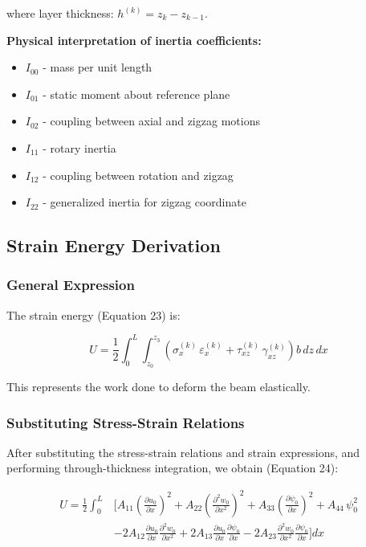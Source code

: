 \documentclass[12pt,a4paper]{article}
\begin{document}
where layer thickness: $h^{(k)} = z_k - z_{k-1}$.

\textbf{Physical interpretation of inertia coefficients:}
\begin{itemize}
\item $I_{00}$ - mass per unit length
\item $I_{01}$ - static moment about reference plane
\item $I_{02}$ - coupling between axial and zigzag motions
\item $I_{11}$ - rotary inertia
\item $I_{12}$ - coupling between rotation and zigzag
\item $I_{22}$ - generalized inertia for zigzag coordinate
\end{itemize}

\subsection{Strain Energy Derivation}

\subsubsection{General Expression}

The strain energy (Equation 23) is:

\begin{equation}
U = \frac{1}{2} \int_0^L \int_{z_0}^{z_3}
\left( \sigma_x^{(k)} \, \varepsilon_x^{(k)}
     + \tau_{xz}^{(k)} \, \gamma_{xz}^{(k)} \right)
b \, dz \, dx
\end{equation}

This represents the work done to deform the beam elastically.

\subsubsection{Substituting Stress-Strain Relations}

After substituting the stress-strain relations and strain expressions, and performing through-thickness integration, we obtain (Equation 24):

\begin{align}
U = \frac{1}{2} \int_0^L &\Bigg[
A_{11} \left(\frac{\partial u_0}{\partial x}\right)^2
+ A_{22} \left(\frac{\partial^2 w_0}{\partial x^2}\right)^2
+ A_{33} \left(\frac{\partial \psi_0}{\partial x}\right)^2
+ A_{44} \, \psi_0^2 \nonumber \\[6pt]
&- 2A_{12} \frac{\partial u_0}{\partial x} \frac{\partial^2 w_0}{\partial x^2}
+ 2A_{13} \frac{\partial u_0}{\partial x} \frac{\partial \psi_0}{\partial x}
- 2A_{23} \frac{\partial^2 w_0}{\partial x^2} \frac{\partial \psi_0}{\partial x}
\Bigg] dx
\end{align}
\end{document}
